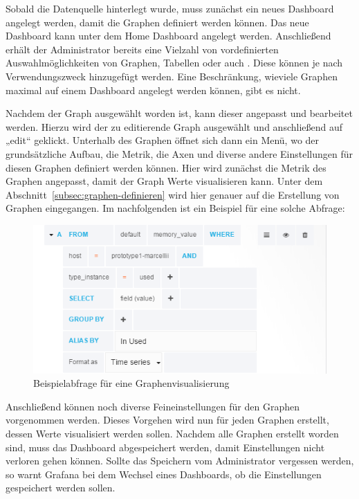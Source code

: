 Sobald die Datenquelle hinterlegt wurde, muss zunächst ein neues Dashboard
angelegt werden, damit die Graphen definiert werden können. Das neue Dashboard
kann unter dem Home Dashboard angelegt werden. Anschließend erhält der
Administrator bereits eine Vielzahl von vordefinierten Auswahlmöglichkeiten von
Graphen, Tabellen oder auch . Diese können je
nach Verwendungszweck hinzugefügt werden. Eine Beschränkung, wieviele Graphen
maximal auf einem Dashboard angelegt werden können, gibt es nicht.

Nachdem der Graph ausgewählt worden ist, kann dieser angepasst und bearbeitet
werden. Hierzu wird der zu editierende Graph ausgewählt und anschließend auf
„edit“ geklickt. Unterhalb des Graphen öffnet sich dann ein Menü, wo der
grundsätzliche Aufbau, die Metrik, die Axen und diverse andere Einstellungen
für diesen Graphen definiert werden können. Hier wird zunächst die Metrik des
Graphen angepasst, damit der Graph Werte visualisieren kann. Unter dem
Abschnitt~\ref{subsec:graphen-definieren} wird hier genauer auf die Erstellung
von Graphen eingegangen. Im nachfolgenden ist ein Beispiel für eine solche
Abfrage:

\begin{figure}[H]
  \centering
  \includegraphics[width=1.0\textwidth]{../figures/graph.png}
  \caption{Beispielabfrage für eine Graphenvisualisierung}
\label{figure:graph}
\end{figure}

Anschließend können noch diverse Feineinstellungen für den Graphen vorgenommen
werden. Dieses Vorgehen wird nun für jeden Graphen erstellt, dessen Werte
visualisiert werden sollen. Nachdem alle Graphen erstellt worden sind, muss das
Dashboard abgespeichert werden, damit Einstellungen nicht verloren gehen
können. Sollte das Speichern vom Administrator vergessen werden, so warnt
Grafana bei dem Wechsel eines Dashboards, ob die Einstellungen gespeichert
werden sollen.

